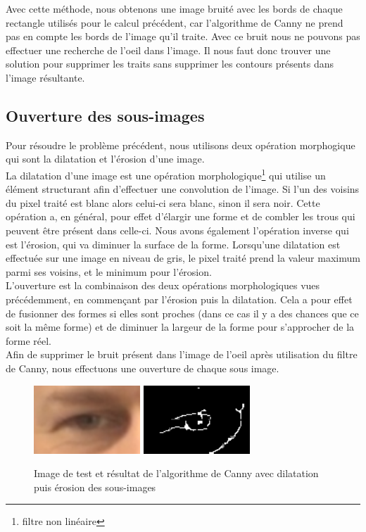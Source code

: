 Avec cette méthode, nous obtenons une image bruité avec les bords de chaque rectangle utilisés
pour le calcul précédent, car l'algorithme de Canny ne prend pas en compte les bords de l'image
qu'il traite. Avec ce bruit nous ne pouvons pas effectuer une recherche de l'oeil dans
l'image. Il nous faut donc trouver une solution pour supprimer les traits
sans supprimer les contours présents dans l'image résultante.

\subsection{Ouverture des sous-images}

Pour résoudre le problème précédent, nous utilisons deux opération morphogique qui sont
la dilatation et l'érosion d'une image.\\

La dilatation d'une image est une opération morphologique\footnote{filtre non linéaire} qui utilise 
un élément structurant afin d'effectuer une convolution de l'image. Si l'un des voisins du pixel traité
est blanc alors celui-ci sera blanc, sinon il sera noir.
Cette opération a, en général, pour effet d'élargir une forme et de combler les trous qui peuvent être présent
dans celle-ci. Nous avons également l'opération inverse qui est l'érosion, qui va diminuer la surface de la forme.
Lorsqu'une dilatation est effectuée sur une image en niveau de gris, le pixel traité prend la valeur maximum parmi
ses voisins, et le minimum pour l'érosion.\\

L'ouverture est la combinaison des deux opérations morphologiques vues précédemment, en commençant par 
l'érosion puis la dilatation. Cela a pour effet de fusionner des formes si elles sont proches (dans ce
cas il y a des chances que ce soit la même forme) et de diminuer la largeur de la forme pour 
s'approcher de la forme réel.\\ 

Afin de supprimer le bruit présent dans l'image de l'oeil après utilisation du filtre de Canny, nous effectuons une ouverture
de chaque sous image.

\begin{figure}[H]
 \center
 \includegraphics[width=4cm]{image/original.png}
 \includegraphics[width=4cm]{image/canny_final.png}
 \caption{Image de test et résultat de l'algorithme de Canny avec dilatation puis érosion des sous-images}
\end{figure}

